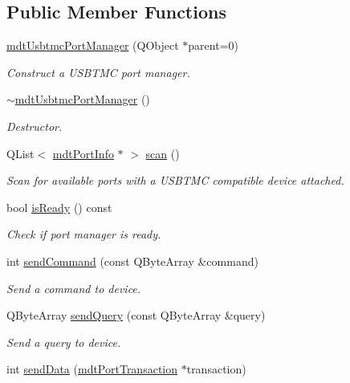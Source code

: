 \subsection*{Public Member Functions}
\begin{DoxyCompactItemize}
\item 
\hyperlink{classmdt_usbtmc_port_manager_a99a24e4360e70ffc63677dbe888513f7}{mdtUsbtmcPortManager} (QObject $\ast$parent=0)
\begin{DoxyCompactList}\small\item\em Construct a USBTMC port manager. \end{DoxyCompactList}\item 
\hyperlink{classmdt_usbtmc_port_manager_aad6b2eef9b5cfb5c324affb6962a463b}{$\sim$mdtUsbtmcPortManager} ()
\begin{DoxyCompactList}\small\item\em Destructor. \end{DoxyCompactList}\item 
QList$<$ \hyperlink{classmdt_port_info}{mdtPortInfo} $\ast$ $>$ \hyperlink{classmdt_usbtmc_port_manager_a992d1227810186d3c7dc166452e2e3b6}{scan} ()
\begin{DoxyCompactList}\small\item\em Scan for available ports with a USBTMC compatible device attached. \end{DoxyCompactList}\item 
bool \hyperlink{classmdt_usbtmc_port_manager_a0b90ceb0bbf424222ec878a355d206d7}{isReady} () const 
\begin{DoxyCompactList}\small\item\em Check if port manager is ready. \end{DoxyCompactList}\item 
int \hyperlink{classmdt_usbtmc_port_manager_af6abc4a3693fc386a12f346f57282c11}{sendCommand} (const QByteArray \&command)
\begin{DoxyCompactList}\small\item\em Send a command to device. \end{DoxyCompactList}\item 
QByteArray \hyperlink{classmdt_usbtmc_port_manager_acbbb8539c54034989b2ea6f6071e90bf}{sendQuery} (const QByteArray \&query)
\begin{DoxyCompactList}\small\item\em Send a query to device. \end{DoxyCompactList}\item 
int \hyperlink{classmdt_usbtmc_port_manager_a205901666c797055bee1902bd1e1e09c}{sendData} (\hyperlink{classmdt_port_transaction}{mdtPortTransaction} $\ast$transaction)

\end{DoxyCompactItemize}
